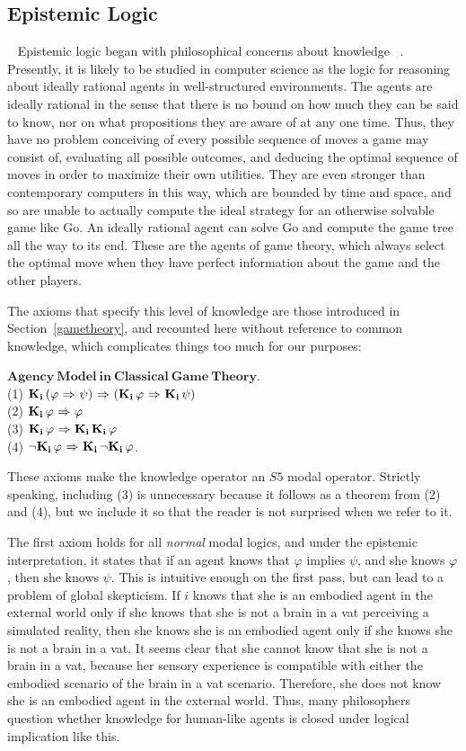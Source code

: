 \subsection{Epistemic Logic}~\label{epistemic_logic}
Epistemic logic began with philosophical concerns about knowledge ~\cite{FHMV,Hintikka,rescher}. Presently, it is likely to be studied in computer science as the logic for reasoning about ideally rational agents in well-structured environments. The agents are ideally rational in the sense that there is no bound on how much they can be said to know, nor on what propositions they are aware of at any one time. Thus, they have no problem conceiving of every possible sequence of moves a game may consist of, evaluating all possible outcomes, and deducing the optimal sequence of moves in order to maximize their own utilities. They are even stronger than contemporary computers in this way, which are bounded by time and space, and so are unable to actually compute the ideal strategy for an otherwise solvable game like Go. An ideally rational agent can solve Go and compute the game tree all the way to its end. These are the agents of game theory, which always select the optimal move when they have perfect information about the game and the other players.

The axioms that specify this level of knowledge are those introduced in Section~\ref{gametheory}, and recounted here without reference to common knowledge, which complicates things too much for our purposes:

$\mathbf{Agency\  Model\  in\  Classical\  Game\  Theory}$.\\
(1) $\mathbf{K}_{\mathbf{i}}\,(\varphi {\ \Rightarrow \ } \psi) {\ \Rightarrow \ } (\mathbf{K}_{\mathbf{i}}\,\varphi {\ \Rightarrow \ } \mathbf{K}_{\mathbf{i}}\,\psi)$\\
(2) $\mathbf{K}_{\mathbf{i}}\,\varphi {\ \Rightarrow \ } \varphi$\\
(3) $\mathbf{K}_{\mathbf{i}}\,\varphi {\ \Rightarrow \ } \mathbf{K}_{\mathbf{i}}\,\mathbf{K}_{\mathbf{i}}\,\varphi$\\
(4) ${\neg} \mathbf{K}_{\mathbf{i}}\,\varphi {\ \Rightarrow \ } \mathbf{K}_{\mathbf{i}}\,{\neg}\mathbf{K}_{\mathbf{i}}\,\varphi$.

These axioms make the knowledge operator an $\mathit{S5}$ modal operator. Strictly speaking, including (3) is unnecessary because it follows as a theorem from (2) and (4), but we include it so that the reader is not surprised when we refer to it.

The first axiom holds for all \emph{normal} modal logics, and under the epistemic interpretation, it states that if an agent knows that $\varphi$ implies $\psi$, and she knows $\varphi$, then she knows $\psi$. This is intuitive enough on the first pass, but can lead to a problem of global skepticism. If $i$ knows that she is an embodied agent in the external world only if she knows that she is not a brain in a vat perceiving a simulated reality, then she knows she is an embodied agent only if she knows she is not a brain in a vat. It seems clear that she cannot know that she is not a brain in a vat, because her sensory experience is compatible with either the embodied scenario of the brain in a vat scenario. Therefore, she does not know she is an embodied agent in the external world. Thus, many philosophers question whether knowledge for human-like agents is closed under logical implication like this.

